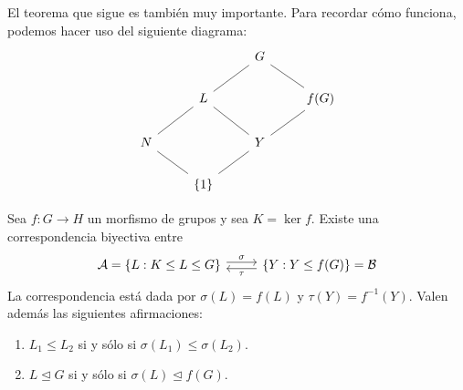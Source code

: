 El teorema que sigue es también muy importante. Para recordar cómo funciona, podemos hacer uso del siguiente diagrama:
\[
\begin{tikzcd}
	&& G \\
	& L && {f(G)} \\
	N && Y \\
	& {\{1\}}
	\arrow[no head, from=1-3, to=2-4]
	\arrow[no head, from=1-3, to=2-2]
	\arrow[no head, from=2-2, to=3-1]
	\arrow[no head, from=3-1, to=4-2]
	\arrow[no head, from=2-2, to=3-3]
	\arrow[no head, from=3-3, to=4-2]
	\arrow[no head, from=2-4, to=3-3]
\end{tikzcd}
\]

\begin{theorem}[de la correspondencia]
Sea $f\colon G\to H$ un morfismo de grupos y sea $K=\ker f$. Existe una correspondencia biyectiva entre
\[\begin{tikzcd}
	{\mathcal{A}=\{L:K\leq L\leq G\}} & {\{Y:Y\leq f(G)\}=\mathcal{B}} 
	\arrow["\sigma", shift left=1, from=1-1, to=1-2]
	\arrow["\tau", shift left=1, from=1-2, to=1-1]
\end{tikzcd}
\]
La correspondencia está dada por $\sigma(L)=f(L)$ y $\tau(Y)=f^{-1}(Y)$. Valen además las siguientes afirmaciones:
\begin{enumerate}
\item $L_1\leq L_2$ si y sólo si $\sigma(L_1)\leq \sigma(L_2)$. 
\item $L\unlhd G$ si y sólo si $\sigma(L)\unlhd f(G)$.
\end{enumerate} 
\end{theorem}

